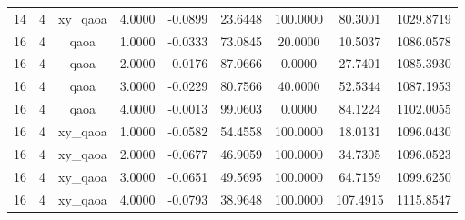 \begin{table}[htbp]
\begin{tabular}{ccccccccc}
    14 & 4 & xy\_qaoa & 4.0000 & -0.0899 & 23.6448 & 100.0000 & 80.3001 & 1029.8719 \\
    16 & 4 & qaoa & 1.0000 & -0.0333 & 73.0845 & 20.0000 & 10.5037 & 1086.0578 \\
    16 & 4 & qaoa & 2.0000 & -0.0176 & 87.0666 & 0.0000 & 27.7401 & 1085.3930 \\
    16 & 4 & qaoa & 3.0000 & -0.0229 & 80.7566 & 40.0000 & 52.5344 & 1087.1953 \\
    16 & 4 & qaoa & 4.0000 & -0.0013 & 99.0603 & 0.0000 & 84.1224 & 1102.0055 \\
    16 & 4 & xy\_qaoa & 1.0000 & -0.0582 & 54.4558 & 100.0000 & 18.0131 & 1096.0430 \\
    16 & 4 & xy\_qaoa & 2.0000 & -0.0677 & 46.9059 & 100.0000 & 34.7305 & 1096.0523 \\
    16 & 4 & xy\_qaoa & 3.0000 & -0.0651 & 49.5695 & 100.0000 & 64.7159 & 1099.6250 \\
    16 & 4 & xy\_qaoa & 4.0000 & -0.0793 & 38.9648 & 100.0000 & 107.4915 & 1115.8547 \\
    \bottomrule
  \end{tabular}
\end{table}